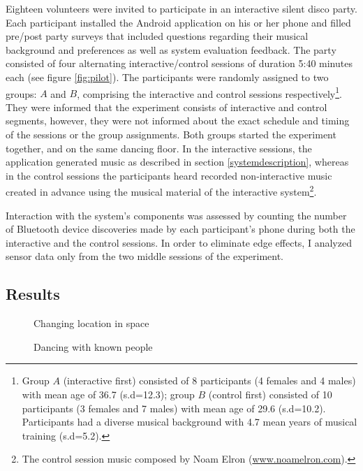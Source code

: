 \documentclass[a4paper,11pt]{article}
\begin{document}
{Eighteen volunteers were invited to participate in an interactive silent disco party.
Each participant installed the Android application on his or her phone and filled pre/post party surveys that included questions regarding their musical background and preferences as well as system evaluation feedback.
The party consisted of four alternating interactive/control sessions of duration 5:40 minutes each (see figure \ref{fig:pilot}).
The participants were randomly assigned to two groups: $A$ and $B$, comprising the interactive and control sessions respectively\footnote{Group $A$ (interactive first) consisted of 8 participants (4 females and 4 males) with mean age of 36.7 (s.d=12.3); group $B$ (control first) consisted of 10 participants (3 females and 7 males) with mean age of 29.6 (s.d=10.2). Participants had a diverse musical background with 4.7 mean years of musical training (s.d=5.2).}.
They were informed that the experiment consists of interactive and control segments, however, they were not informed about the exact schedule and timing of the sessions or the group assignments.
Both groups started the experiment together, and on the same dancing floor.
In the interactive sessions, the application generated music as described in section \ref{systemdescription}, whereas in the control sessions the participants heard recorded non-interactive music created in advance using the musical material of the interactive system\footnote{The control session music composed by Noam Elron (\href{http://www.noamelron.com}{www.noamelron.com}).}.

Interaction with the system's components was assessed by counting the number of Bluetooth device discoveries made by each participant's phone during both the interactive and the control sessions.
In order to eliminate edge effects, I analyzed sensor data only from the two middle sessions of the experiment.

\subsection{Results}

\begin{figure}[!htb]
	\def\svgwidth{0.95\columnwidth}
  	
	\caption{Changing location in space}\label{fig:location}
\endminipage\hfill
{}
	\def\svgwidth{0.95\columnwidth}
	
	\caption{Dancing with known people}\label{fig:known}
\endminipage\hfill
\end{figure}

}
\end{document}
